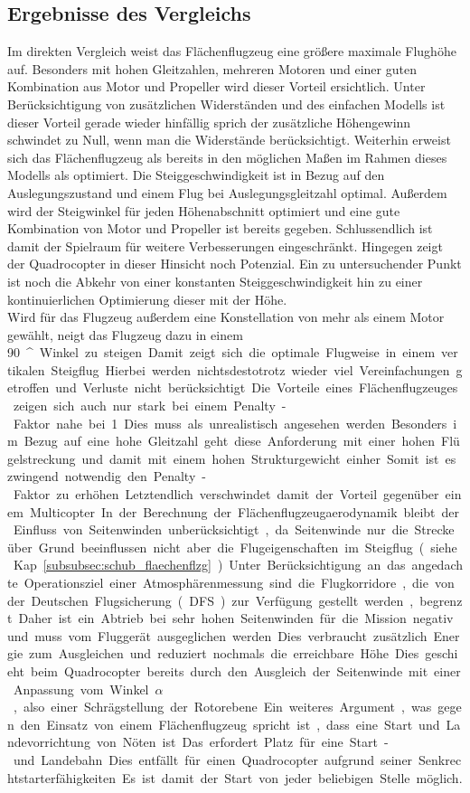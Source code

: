 \subsection{Ergebnisse des Vergleichs} 
Im direkten Vergleich weist das Flächenflugzeug eine größere maximale Flughöhe auf. Besonders mit hohen Gleitzahlen, mehreren Motoren und einer guten Kombination aus Motor und Propeller wird dieser Vorteil ersichtlich. Unter Berücksichtigung von zusätzlichen Widerständen und des einfachen Modells ist dieser Vorteil gerade wieder hinfällig sprich der zusätzliche Höhengewinn schwindet zu Null, wenn man die Widerstände berücksichtigt. Weiterhin erweist sich das Flächenflugzeug als bereits in den möglichen Maßen im Rahmen dieses Modells als optimiert. Die Steiggeschwindigkeit ist in Bezug auf den Auslegungszustand und einem Flug bei Auslegungsgleitzahl optimal. Außerdem wird der Steigwinkel für jeden Höhenabschnitt optimiert und eine gute Kombination von Motor und Propeller ist bereits gegeben. Schlussendlich ist damit der Spielraum für weitere Verbesserungen eingeschränkt. Hingegen zeigt der Quadrocopter in dieser Hinsicht noch Potenzial. Ein zu untersuchender Punkt ist noch die Abkehr von einer konstanten Steiggeschwindigkeit hin zu einer kontinuierlichen Optimierung dieser mit der Höhe. \\
Wird für das Flugzeug außerdem eine Konstellation von mehr als einem Motor gewählt, neigt das Flugzeug dazu in einem \SI{90}{^\circ} Winkel zu steigen. Damit zeigt sich die optimale Flugweise in einem vertikalen Steigflug. Hierbei werden nichtsdestotrotz wieder viel Vereinfachungen getroffen und Verluste nicht berücksichtigt. Die Vorteile eines Flächenflugzeuges zeigen sich auch nur stark bei einem Penalty-Faktor nahe bei 1. Dies muss als unrealistisch angesehen werden. Besonders im Bezug auf eine hohe Gleitzahl geht diese Anforderung mit einer hohen Flügelstreckung und damit mit einem hohen Strukturgewicht einher. Somit ist es zwingend notwendig den Penalty-Faktor zu erhöhen. Letztendlich verschwindet damit der Vorteil gegenüber einem Multicopter. 
In der Berechnung der Flächenflugzeugaerodynamik bleibt der Einfluss von Seitenwinden unberücksichtigt, da Seitenwinde nur die Strecke über Grund beeinflussen nicht aber die Flugeigenschaften im Steigflug (siehe Kap. \ref{subsubsec:schub_flaechenflzg}). Unter Berücksichtigung an das angedachte Operationsziel einer Atmosphärenmessung sind die Flugkorridore, die von der Deutschen Flugsicherung (DFS) zur Verfügung gestellt werden, begrenzt. Daher ist ein Abtrieb bei sehr hohen Seitenwinden für die Mission negativ und muss vom Fluggerät ausgeglichen werden. Dies verbraucht zusätzlich Energie zum Ausgleichen und reduziert nochmals die erreichbare Höhe. Dies geschieht beim Quadrocopter bereits durch den Ausgleich der Seitenwinde mit einer Anpassung vom Winkel \ensuremath{\alpha}, also einer Schrägstellung der Rotorebene. Ein weiteres Argument, was gegen den Einsatz von einem Flächenflugzeug spricht ist, dass eine Start und Landevorrichtung von Nöten ist. Das erfordert Platz für eine Start- und Landebahn. Dies entfällt für einen Quadrocopter aufgrund seiner Senkrechtstarterfähigkeiten. Es ist damit der Start von jeder beliebigen Stelle möglich.
